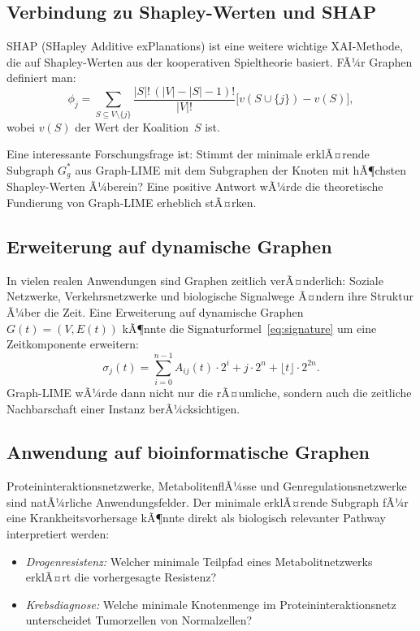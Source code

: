 ﻿\documentclass[a4paper,12pt]{article}
\theoremstyle{definition}
\begin{document}
\subsection{Verbindung zu Shapley-Werten und SHAP}

SHAP (SHapley Additive exPlanations) \citep{Lundberg2017} ist eine weitere
wichtige XAI-Methode, die auf Shapley-Werten aus der kooperativen Spieltheorie
basiert. FÃ¼r Graphen definiert man:
\[
  \phi_j = \sum_{S \subseteq V \setminus \{j\}}
  \frac{|S|!\,(|V|-|S|-1)!}{|V|!}
  \bigl[v(S \cup \{j\}) - v(S)\bigr],
\]
wobei $v(S)$ der Wert der Koalition~$S$ ist.

Eine interessante Forschungsfrage ist: Stimmt der minimale erklÃ¤rende Subgraph
$G^*_g$ aus Graph-LIME mit dem Subgraphen der Knoten mit hÃ¶chsten Shapley-Werten
Ã¼berein?
Eine positive Antwort wÃ¼rde die theoretische Fundierung von Graph-LIME
erheblich stÃ¤rken.

\subsection{Erweiterung auf dynamische Graphen}

In vielen realen Anwendungen sind Graphen zeitlich verÃ¤nderlich:
Soziale Netzwerke, Verkehrsnetzwerke und biologische Signalwege Ã¤ndern ihre
Struktur Ã¼ber die Zeit.
Eine Erweiterung auf dynamische Graphen $G(t) = (V, E(t))$ kÃ¶nnte
die Signaturformel~\eqref{eq:signature} um eine Zeitkomponente erweitern:
\[
  \sigma_j(t) = \sum_{i=0}^{n-1} A_{ij}(t) \cdot 2^i + j \cdot 2^n
                + \lfloor t \rfloor \cdot 2^{2n}.
\]
Graph-LIME wÃ¼rde dann nicht nur die rÃ¤umliche, sondern auch die zeitliche
Nachbarschaft einer Instanz berÃ¼cksichtigen.

\subsection{Anwendung auf bioinformatische Graphen}

Proteininteraktionsnetzwerke, MetabolitenflÃ¼sse und Genregulationsnetzwerke
sind natÃ¼rliche Anwendungsfelder.
Der minimale erklÃ¤rende Subgraph fÃ¼r eine Krankheitsvorhersage kÃ¶nnte direkt
als biologisch relevanter Pathway interpretiert werden:
\begin{itemize}
  \item \emph{Drogenresistenz:} Welcher minimale Teilpfad eines Metabolitnetzwerks
        erklÃ¤rt die vorhergesagte Resistenz?
  \item \emph{Krebsdiagnose:} Welche minimale Knotenmenge im Proteininteraktionsnetz
        unterscheidet Tumorzellen von Normalzellen?
\end{itemize}
\end{document}
